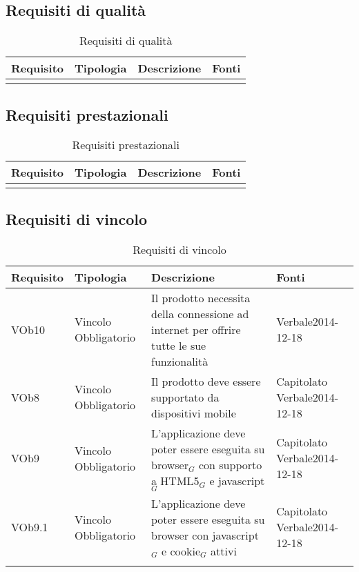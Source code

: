 \subsection{ Requisiti di qualità}
	
\begin{longtable}{|l|p{2.5cm}|p{5cm}|p{3.5cm}|}
\hline
\textbf{Requisito} & \textbf{Tipologia} & \textbf{Descrizione} & \textbf{Fonti} \\
\hline
\caption{Requisiti di qualità}
\end{longtable}
\subsection{ Requisiti prestazionali}
	
\begin{longtable}{|l|p{2.5cm}|p{5cm}|p{3.5cm}|}
\hline
\textbf{Requisito} & \textbf{Tipologia} & \textbf{Descrizione} & \textbf{Fonti} \\
\hline
\caption{Requisiti prestazionali}
\end{longtable}
\subsection{ Requisiti di vincolo}
	
\begin{longtable}{|l|p{2.5cm}|p{5cm}|p{3.5cm}|}
\hline
\textbf{Requisito} & \textbf{Tipologia} & \textbf{Descrizione} & \textbf{Fonti} \\
\hline
VOb10 & Vincolo \linebreak Obbligatorio & Il prodotto necessita della connessione ad internet per offrire tutte le sue funzionalità & Verbale2014-12-18 \linebreak \\
\hline
VOb8 & Vincolo \linebreak Obbligatorio & Il prodotto deve essere supportato da dispositivi mobile & Capitolato \linebreak Verbale2014-12-18 \linebreak \\
\hline
VOb9 & Vincolo \linebreak Obbligatorio & L'applicazione deve poter essere eseguita su browser$_G$ con supporto a HTML5$_G$ e javascript$_G$ & Capitolato \linebreak Verbale2014-12-18 \linebreak \\
\hline
VOb9.1 & Vincolo \linebreak Obbligatorio & L'applicazione deve poter essere eseguita su browser con javascript$_G$ e cookie$_G$ attivi & Capitolato \linebreak  Verbale2014-12-18 \linebreak  \\
\hline
\caption{Requisiti di vincolo}
\end{longtable}
